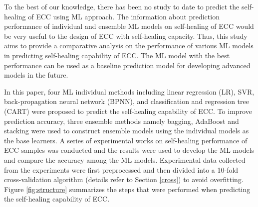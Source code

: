 \documentclass[11pt]{article}
\begin{document}
		 
	
To the best of our knowledge, there has been no study to date to predict the self-healing of ECC using ML approach. The information about prediction performance of individual and ensemble ML models on self-healing of ECC would be very useful to the design of ECC with self-healing capacity. Thus, this study  aims  to  provide  a comparative  analysis  on  the  performance  of  various  ML  models in predicting self-healing capability of ECC. The ML model with the best performance can be used as a baseline prediction model for developing advanced models in the future.

In this paper, four ML individual methods including linear regression (LR), SVR, back-propagation neural network (BPNN), and classification and regression tree (CART) were proposed to predict the self-healing capability of ECC. To improve prediction accuracy,  three ensemble methods namely bagging, AdaBoost and stacking were used to construct ensemble models using the individual models as the base learners. A series of experimental works on self-healing performance of ECC samples was conducted and the results were used to develop the ML models and compare the accuracy among the ML models. Experimental data collected from the experiments were first preprocessed and then divided into a 10-fold cross-validation algorithm (details refer to Section \ref{cross}) to avoid overfitting. Figure \ref{fig:structure} summarizes the steps that were performed when predicting the self-healing capability of ECC.
	
\end{document}
